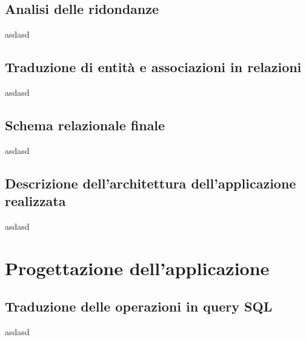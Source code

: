 \documentclass[a4paper,12pt]{report}
\begin{document}
    	\section{Analisi delle ridondanze}
        	asdasd
        	
    	\section{Traduzione di entità e associazioni in relazioni}
        	asdasd
        	
    	\section{Schema relazionale finale}
        	asdasd
        	
    	\section{Descrizione dell'architettura dell'applicazione realizzata}
        	asdasd
        	

	\chapter*{Progettazione dell'applicazione}
	
    	\section*{Traduzione delle operazioni in query SQL}
    	    asdasd
 
\end{document}
